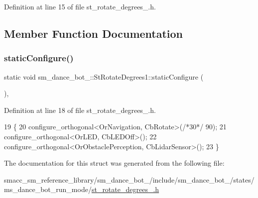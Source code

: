 Definition at line 15 of file st\+\_\+rotate\+\_\+degrees\+\_.\+h.



\subsection{Member Function Documentation}
\mbox{\label{structsm__dance__bot__2_1_1StRotateDegrees1_aa1ac1bb8334e31e0550df507ddd8e8c0}} 
\subsubsection{\texorpdfstring{static\+Configure()}{staticConfigure()}}
{\footnotesize\ttfamily static void sm\+\_\+dance\+\_\+bot\+\_\+::\+St\+Rotate\+Degrees1\+::static\+Configure (\begin{DoxyParamCaption}{ }\end{DoxyParamCaption})\hspace{0.3cm}{\ttfamily [inline]}, {\ttfamily [static]}}



Definition at line 18 of file st\+\_\+rotate\+\_\+degrees\+\_.\+h.


\begin{DoxyCode}
19   \{
20     configure\_orthogonal<OrNavigation, CbRotate>(\textcolor{comment}{/*30*/} 90);
21     configure\_orthogonal<OrLED, CbLEDOff>();
22     configure\_orthogonal<OrObstaclePerception, CbLidarSensor>();
23   \}
\end{DoxyCode}


The documentation for this struct was generated from the following file\+:\begin{DoxyCompactItemize}
\item 
smacc\+\_\+sm\+\_\+reference\+\_\+library/sm\+\_\+dance\+\_\+bot\+\_/include/sm\+\_\+dance\+\_\+bot\+\_/states/ms\+\_\+dance\+\_\+bot\+\_\+run\+\_\+mode/\hyperlink{sm__dance__bot__2_2include_2sm__dance__bot__2_2states_2ms__dance__bot__run__mode_2st__rotate__degrees__1_8h}{st\+\_\+rotate\+\_\+degrees\+\_.\+h}\end{DoxyCompactItemize}
